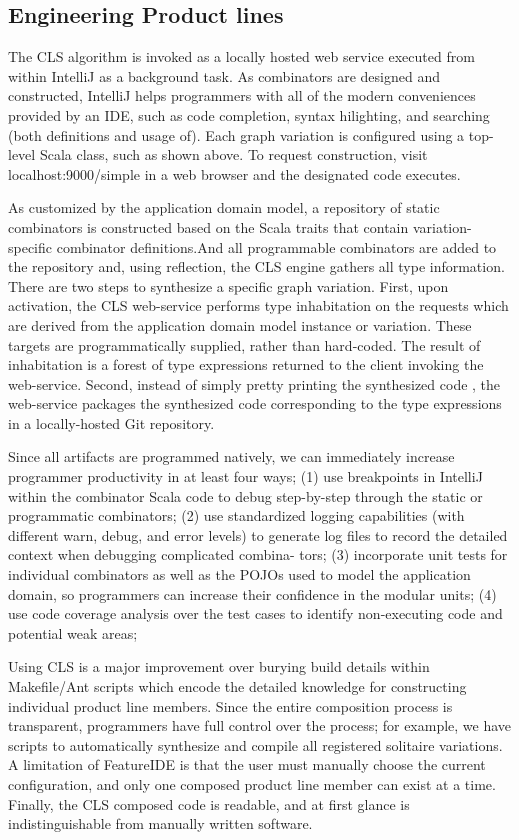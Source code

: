  \subsection{Engineering Product lines}

 The CLS algorithm is invoked as a locally hosted web service executed from within IntelliJ as a background task.
 As combinators are designed and constructed, IntelliJ helps programmers with all of the modern conveniences
 provided by an IDE, such as code completion, syntax hilighting, and searching (both definitions and usage of).
 Each graph variation is configured using a top-level Scala class, such as shown above.
 To request construction, visit localhost:9000/simple in a web browser and the designated code executes.

 As customized by the application domain model, a repository of static combinators is constructed
 based on the Scala traits that contain variation-specific combinator definitions.And all programmable combinators
 are added to the repository and, using reflection, the CLS engine gathers all type information.
 There are two steps to synthesize a specific graph variation. First, upon activation, the CLS web-service
 performs type inhabitation on the requests which are derived from the application domain model instance or variation.
  These targets are programmatically supplied, rather than hard-coded.
  The result of inhabitation is a forest of type expressions returned to
 the client invoking the web-service. Second, instead of simply pretty printing the synthesized code
 , the web-service packages the synthesized code corresponding to the type
 expressions in a locally-hosted Git repository.

 Since all artifacts are programmed natively, we can immediately increase programmer
 productivity in at least four ways; (1) use breakpoints in IntelliJ within the combinator Scala code to debug
 step-by-step through the static or programmatic combinators; (2) use standardized logging capabilities
 (with different warn, debug, and error levels) to generate log files to record the detailed context when debugging
 complicated combina- tors; (3) incorporate unit tests for individual combinators as well as the POJOs used to
 model the application domain, so programmers can increase their confidence in the modular units; (4) use code
 coverage analysis over the test cases to identify non-executing code and potential weak areas;

 Using CLS is a major improvement over burying build details within Makefile/Ant scripts which encode the detailed
 knowledge for constructing individual product line members. Since the entire composition process is transparent,
 programmers have full control over the process; for example, we have scripts to automatically synthesize and
 compile all registered solitaire variations.
 A limitation of FeatureIDE is that the user must manually choose the current configuration, and only one composed
 product line member can exist at a time. Finally, the CLS composed code is readable, and at first glance is
 indistinguishable from manually written software.